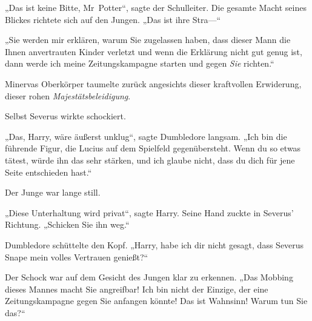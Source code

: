 „Das ist keine Bitte, Mr~Potter“, sagte der Schulleiter. Die gesamte Macht seines Blickes richtete sich auf den Jungen. „Das ist ihre Stra—“

„Sie werden mir erklären, warum Sie zugelassen haben, dass dieser Mann die Ihnen anvertrauten Kinder verletzt und wenn die Erklärung nicht gut genug ist, dann werde ich meine Zeitungskampagne starten und gegen \emph{Sie} richten.“

Minervas Oberkörper taumelte zurück angesichts dieser kraftvollen Erwiderung, dieser rohen \emph{Majestätsbeleidigung}.

Selbst Severus wirkte schockiert.

„Das, Harry, wäre äußerst unklug“, sagte Dumbledore langsam. „Ich bin die führende Figur, die Lucius auf dem Spielfeld gegenübersteht. Wenn du so etwas tätest, würde ihn das sehr stärken, und ich glaube nicht, dass du dich für jene Seite entschieden hast.“

Der Junge war lange still.

„Diese Unterhaltung wird privat“, sagte Harry. Seine Hand zuckte in Severus’ Richtung. „Schicken Sie ihn weg.“

Dumbledore schüttelte den Kopf. „Harry, habe ich dir nicht gesagt, dass Severus Snape mein volles Vertrauen genießt?“

Der Schock war auf dem Gesicht des Jungen klar zu erkennen. „Das Mobbing dieses Mannes macht Sie angreifbar! Ich bin nicht der Einzige, der eine Zeitungskampagne gegen Sie anfangen könnte! Das ist Wahnsinn! Warum tun Sie das?“


